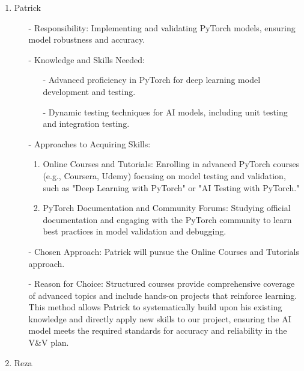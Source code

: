 \documentclass[12pt, titlepage]{article}
\begin{document}
\begin{enumerate}
\begin{enumerate}
\begin{enumerate}
\begin{enumerate}
  \item Patrick

  \begin{itemize}
      \item[-]Responsibility: Implementing and validating PyTorch models, ensuring model robustness and accuracy.
      \item[-] Knowledge and Skills Needed:
      \begin{itemize}
          \item[-] Advanced proficiency in PyTorch for deep learning model development and testing.
          \item[-] Dynamic testing techniques for AI models, including unit testing and integration testing.
      \end{itemize}
      \item[-] Approaches to Acquiring Skills:
      \begin{enumerate}
          \item Online Courses and Tutorials: Enrolling in advanced PyTorch courses (e.g., Coursera, Udemy) focusing on model testing and validation, such as "Deep Learning with PyTorch" or "AI Testing with PyTorch."
          \item PyTorch Documentation and Community Forums: Studying official documentation and engaging with the PyTorch community to learn best practices in model validation and debugging.
      \end{enumerate}
      \item[-] Chosen Approach: Patrick will pursue the Online Courses and Tutorials approach.
      \item[-] Reason for Choice: Structured courses provide comprehensive coverage of advanced topics and include hands-on projects that reinforce learning. This method allows Patrick to systematically build upon his existing knowledge and directly apply new skills to our project, ensuring the AI model meets the required standards for accuracy and reliability in the V\&V plan.
  \end{itemize}

  \item Reza


\end{enumerate}
\end{enumerate}
\end{enumerate}
\end{enumerate}
\end{document}
